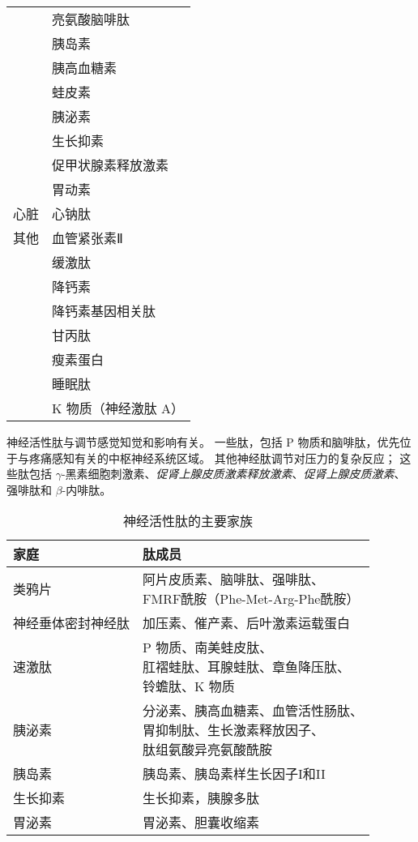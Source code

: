 \begin{table}[htbp]
\begin{tabular}{ll}
		 & 亮氨酸脑啡肽   \\
		 & 胰岛素   \\
		 & 胰高血糖素   \\
		 & 蛙皮素   \\
		 & 胰泌素   \\
		 & 生长抑素   \\
		 & 促甲状腺素释放激素   \\
		 & 胃动素   \\
		心脏 & 心钠肽   \\
		其他 & 血管紧张素Ⅱ   \\
		 & 缓激肽   \\
		 & 降钙素   \\
		 & 降钙素基因相关肽   \\
		 & 甘丙肽   \\
		 & 瘦素蛋白   \\
		 & 睡眠肽   \\
		 & K 物质（神经激肽 A）   \\
		\bottomrule
	\end{tabular}
\end{table}


神经活性肽与调节感觉知觉和影响有关。
一些肽，包括 P 物质和脑啡肽，优先位于与疼痛感知有关的中枢神经系统区域。
其他神经肽调节对压力的复杂反应；
这些肽包括 $\gamma$-黑素细胞刺激素、\textit{促肾上腺皮质激素释放激素}、\textit{促肾上腺皮质激素}、强啡肽和 $\beta$-内啡肽。


\begin{table}[htbp]
	\caption{神经活性肽的主要家族} \label{tab:16_3} \centering
	\begin{tabular}{ll}
		\toprule
		家庭 & 肽成员 \\
		\midrule
		类鸦片 & \makecell[l]{阿片皮质素、脑啡肽、强啡肽、\\FMRF酰胺（Phe-Met-Arg-Phe酰胺）}  \\
		神经垂体密封神经肽 & 加压素、催产素、后叶激素运载蛋白  \\
		速激肽 & \makecell[l]{P 物质、南美蛙皮肽、\\肛褶蛙肽、耳腺蛙肽、章鱼降压肽、\\铃蟾肽、K 物质}  \\
		胰泌素 & \makecell[l]{分泌素、胰高血糖素、血管活性肠肽、\\胃抑制肽、生长激素释放因子、\\肽组氨酸异亮氨酸酰胺}  \\
		胰岛素 & 胰岛素、胰岛素样生长因子I和II  \\
		生长抑素 & 生长抑素，胰腺多肽  \\
		胃泌素 & 胃泌素、胆囊收缩素  \\
		\bottomrule
	\end{tabular}
\end{table}



